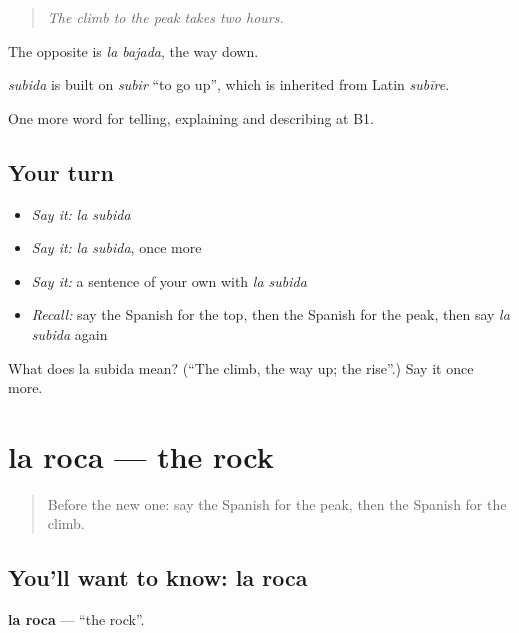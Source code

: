 \begin{quote}
\emph{The climb to the peak takes two hours.}
\end{quote}

The opposite is \emph{la bajada}, the way down.

\begin{cousinweb}
\emph{subida} is built on \emph{subir} \textquotedblleft{}to go up\textquotedblright{}, which is inherited from Latin \emph{subīre}.
\end{cousinweb}

\begin{grammarlens}[title={What you've built}]
One more word for telling, explaining and describing at B1.
\end{grammarlens}

\subsection*{Your turn}
\begin{itemize}
\raggedright
  \item \emph{Say it:} \emph{la subida}
  \item \emph{Say it:} \emph{la subida}, once more
  \item \emph{Say it:} a sentence of your own with \emph{la subida}
  \item \emph{Recall:} say the Spanish for the top, then the Spanish for the peak, then say \emph{la subida} again
\end{itemize}

\begin{tcolorbox}[breakable,colback=teal!4,colframe=teal!35!black,title={Before you move on}]
What does la subida mean? (\textquotedblleft{}The climb, the way up; the rise\textquotedblright{}.) Say it once more.
\end{tcolorbox}
\section[la roca]{la roca — the rock}

\label{lesson:ES-C686-roca}



\begin{quote}
Before the new one: say the Spanish for the peak, then the Spanish for the climb.
\end{quote}

\subsection*{You'll want to know: la roca}
\textbf{la roca} — \textquotedblleft{}the rock\textquotedblright{}.

